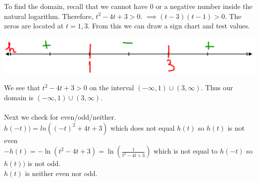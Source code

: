 \documentclass[nooutcomes, noinstructornotes]{ximera}
\begin{document}
\begin{problem}
\begin{enumerate}
		\begin{freeResponse}
		To find the domain, recall that we cannot have $0$ or a negative number inside the natural logarithm.  Therefore, $t^2-4t+3>0$.
			$\implies (t-3)(t-1)>0$.  The zeros are located at $t=1,3$.  From this we can draw a sign chart and test values.

	\begin{image}		
	\includegraphics[scale=0.2]{Figure10.png}
	\end{image}
		We see that $t^2-4t+3>0$ on the interval $(-\infty,1) \cup (3,\infty)$.  Thus our domain is $(-\infty,1) \cup (3,\infty)$.\\ \\
		
		Next we check for even/odd/neither.\\
		$h(-t))=ln((-t)^2+4t+3)$ which does not equal $h(t)$ so $h(t)$ is not even\\
		$-h(t)=-\ln(t^2-4t+3)=\ln\left( \frac{1}{t^2-4t+3} \right)$ which is not equal to $h(-t)$ so $h(t))$ is not odd.\\
		$h(t)$ is neither even nor odd.


		\end{freeResponse}

\end{enumerate}

\end{problem}
\end{document}
